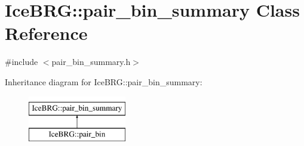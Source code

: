 \hypertarget{classIceBRG_1_1pair__bin__summary}{}\section{Ice\+B\+R\+G\+:\+:pair\+\_\+bin\+\_\+summary Class Reference}
\label{classIceBRG_1_1pair__bin__summary}


{\ttfamily \#include $<$pair\+\_\+bin\+\_\+summary.\+h$>$}

Inheritance diagram for Ice\+B\+R\+G\+:\+:pair\+\_\+bin\+\_\+summary\+:\begin{figure}[H]
\begin{center}
\leavevmode
\includegraphics[height=2.000000cm]{classIceBRG_1_1pair__bin__summary}
\end{center}
\end{figure}
